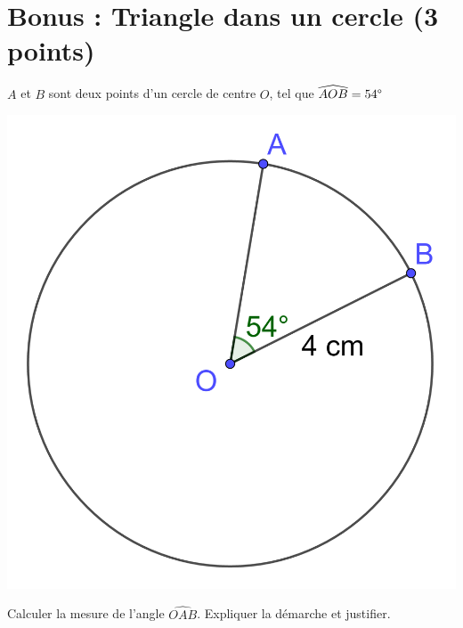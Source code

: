 \section*{Bonus : Triangle dans un cercle (3 points)}

$A$ et $B$ sont deux points d'un cercle de centre $O$, tel que $\widehat{AOB}=54\degree$

\begin{center}
	\includegraphics[scale=0.15]{img/cercle}
\end{center}

\begin{questions}
	\question[3] Calculer la mesure de l'angle $\widehat{OAB}$. Expliquer la démarche et justifier.
\end{questions}